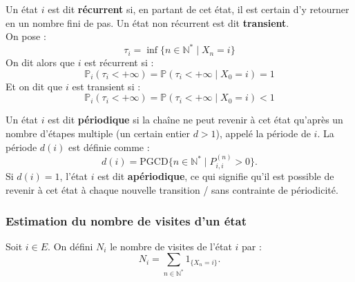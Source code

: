 \documentclass{article}
\begin{document}
\begin{tcolorbox}[colback=white,colframe=blue!80!black,title=État récurrent/transient]
Un état $i$ est dit \textbf{récurrent} si, en partant de cet état, il est certain d'y retourner en un nombre fini de pas. Un état non récurrent est dit \textbf{transient}. \\

On pose :
\[
\tau_i = \inf\{n \in \mathbb{N}^{*} \mid X_n = i\}
\]
On dit alors que $i$ est récurrent si :
\[
\mathbb{P}_i(\tau_i < +\infty) = \mathbb{P}(\tau_i < +\infty \mid X_0 = i) = 1
\]
Et on dit que $i$ est transient si :
\[
\mathbb{P}_i(\tau_i < +\infty) = \mathbb{P}(\tau_i < +\infty \mid X_0 = i) < 1
\]
\end{tcolorbox}

\begin{tcolorbox}[colback=white,colframe=blue!80!black,title=État périodique/apériodique]
Un état $i$ est dit \textbf{périodique} si la chaîne ne peut revenir à cet état qu'après un nombre d'étapes multiple (un certain entier $d > 1$), appelé la période de $i$. La période $d(i)$ est définie comme :
\[
d(i) = \text{PGCD}\{n \in \mathbb{N}^{*} \mid P_{i,i}^{(n)} > 0\}.
\]
Si $d(i) = 1$, l'état $i$ est dit \textbf{apériodique}, ce qui signifie qu'il est possible de revenir à cet état à chaque nouvelle transition /  sans contrainte de périodicité.
\end{tcolorbox}


\subsubsection{Estimation du nombre de visites d'un état}

\begin{tcolorbox}[colback=white,colframe=blue!80!black,title=Formule du nombre de visite d'un état]
Soit $i \in E$. On défini $N_i$ le nombre de visites de l'état $i$ par :
\[
N_i = \sum_{n \in \mathbb{N}^{*}} \text{1}_{\{X_n = i\}}.
\]
\end{tcolorbox}
\end{document}

